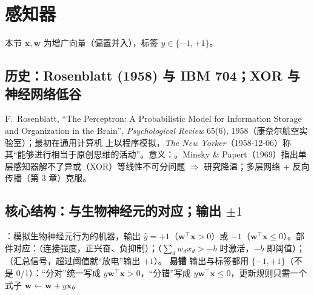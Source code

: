\section{感知器}\label{sec:D02b-perc}
本节 $\bm x,\bm w$ 为增广向量（偏置并入），标签 $y\in\{-1,+1\}$。

\subsection{历史：Rosenblatt (1958) 与 IBM 704；XOR 与神经网络低谷}
F.~Rosenblatt, ``The Perceptron: A Probabilistic Model for Information Storage and Organization in the Brain'', \textit{Psychological Review} 65(6), 1958（康奈尔航空实验室）；最初在通用计算机  上以程序模拟，\textit{The New Yorker}（1958-12-06）称其“能够进行相当于原创思维的活动”。意义：。Minsky \& Papert（1969）指出单层感知器解不了异或（XOR）等线性不可分问题 $\Rightarrow$ 研究降温；多层网络 + 反向传播（第 3 章）克服。

\subsection{核心结构：与生物神经元的对应；输出 \texorpdfstring{$\pm1$}{±1}}
：模拟生物神经元行为的机器，输出 $\hat y=+1$（$\bm w^\top\bm x>0$）或 $-1$（$\bm w^\top\bm x\le0$）。部件对应：（连接强度，正兴奋、负抑制）；（$\sum_dw_dx_d>-b$ 时激活，$-b$ 即阈值）；（汇总信号，超过阈值就“放电”输出 $+1$）。
\textbf{易错} 输出与标签都用 $\{-1,+1\}$（不是 0/1）：“分对”统一写成 $y\bm w^\top\bm x>0$，“分错”写成 $y\bm w^\top\bm x\le0$，更新规则只需一个式子 $\bm w\leftarrow\bm w+y\bm x$。


